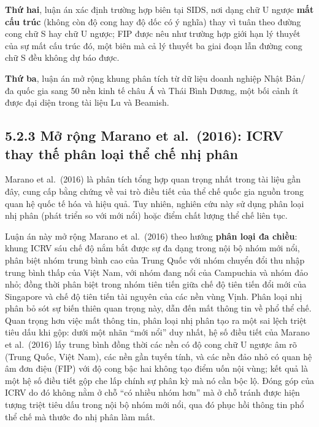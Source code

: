 \documentclass[
  a4paper,
  13pt]{extreport}
\begin{document}
\textbf{Thứ hai}, luận án xác định trường hợp biên tại SIDS, nơi dạng
chữ U ngược \textbf{mất cấu trúc} (không còn độ cong hay độ dốc có ý
nghĩa) thay vì tuân theo đường cong chữ S hay chữ U ngược; FIP được nêu
như trường hợp giới hạn lý thuyết của sự mất cấu trúc đó, một biên mà cả
lý thuyết ba giai đoạn lẫn đường cong chữ S đều không dự báo được.

\textbf{Thứ ba}, luận án mở rộng khung phân tích từ dữ liệu doanh nghiệp
Nhật Bản/đa quốc gia sang 50 nền kinh tế châu Á và Thái Bình Dương, một
bối cảnh ít được đại diện trong tài liệu Lu và Beamish.

\hypertarget{mux1edf-rux1ed9ng-marano-et-al.-2016-icrv-thay-thux1ebf-phuxe2n-loux1ea1i-thux1ec3-chux1ebf-nhux1ecb-phuxe2n}{%
\subsection{5.2.3 Mở rộng Marano et al.~(2016): ICRV thay thế phân loại
thể chế nhị
phân}\label{mux1edf-rux1ed9ng-marano-et-al.-2016-icrv-thay-thux1ebf-phuxe2n-loux1ea1i-thux1ec3-chux1ebf-nhux1ecb-phuxe2n}}

Marano et al.~(2016) là phân tích tổng hợp quan trọng nhất trong tài
liệu gần đây, cung cấp bằng chứng về vai trò điều tiết của thể chế quốc
gia nguồn trong quan hệ quốc tế hóa và hiệu quả. Tuy nhiên, nghiên cứu
này sử dụng phân loại nhị phân (phát triển so với mới nổi) hoặc điểm
chất lượng thể chế liên tục.

Luận án này mở rộng Marano et al.~(2016) theo hướng \textbf{phân loại đa
chiều}: khung ICRV sáu chế độ nắm bắt được sự đa dạng trong nội bộ nhóm
mới nổi, phân biệt nhóm trung bình cao của Trung Quốc với nhóm chuyển
đổi thu nhập trung bình thấp của Việt Nam, với nhóm đang nổi của
Campuchia và nhóm đảo nhỏ; đồng thời phân biệt trong nhóm tiên tiến giữa
chế độ tiên tiến đổi mới của Singapore và chế độ tiên tiến tài nguyên
của các nền vùng Vịnh. Phân loại nhị phân bỏ sót sự biến thiên quan
trọng này, dẫn đến mất thông tin về phổ thể chế. Quan trọng hơn việc mất
thông tin, phân loại nhị phân tạo ra một sai lệch triệt tiêu dấu khi
gộp: dưới một nhãn ``mới nổi'' duy nhất, hệ số điều tiết của Marano et
al.~(2016) lấy trung bình đồng thời các nền có độ cong chữ U ngược âm rõ
(Trung Quốc, Việt Nam), các nền gần tuyến tính, và các nền đảo nhỏ có
quan hệ âm đơn điệu (FIP) với độ cong bậc hai không tạo điểm uốn nội
vùng; kết quả là một hệ số điều tiết gộp che lấp chính sự phân kỳ mà nó
cần bộc lộ. Đóng góp của ICRV do đó không nằm ở chỗ ``có nhiều nhóm
hơn'' mà ở chỗ tránh được hiện tượng triệt tiêu dấu trong nội bộ nhóm
mới nổi, qua đó phục hồi thông tin phổ thể chế mà thước đo nhị phân làm
mất.
\end{document}
